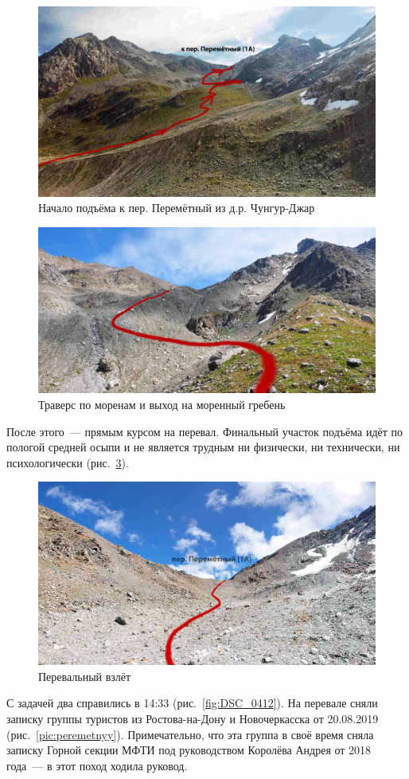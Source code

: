 \begin{figure}[h!]
	\centering
	\includegraphics[width=0.7\linewidth]{../pics/perem_1}
	\caption{Начало подъёма к пер. Перемётный из д.р. Чунгур-Джар}
	\label{fig:perem_1}
\end{figure} 
\begin{figure}[h!]
	\centering
	\includegraphics[width=0.7\linewidth]{../pics/DSC_0280.jpg}
	\caption{Траверс по моренам и выход на  моренный гребень}
	\label{fig:DSC_0280}
\end{figure} 


После этого~--- прямым курсом на перевал. Финальный участок подъёма идёт по пологой средней осыпи и не является трудным ни физически, ни технически, ни психологически (рис.~\ref{fig:DSC_0341}).
\begin{figure}[h!]
	\centering
	\includegraphics[width=0.7\linewidth]{../pics/DSC_0341.jpg}
	\caption{Перевальный взлёт}
	\label{fig:DSC_0341}
\end{figure} 

С задачей два справились в 14:33 (рис.~\ref{fig:DSC_0412}). На перевале сняли записку группы туристов из Ростова-на-Дону и Новочеркасска от 20.08.2019 (рис.~\ref{pic:peremetnyy}). Примечательно, что эта группа в своё время сняла записку Горной секции МФТИ под руководством Королёва Андрея от 2018 года~--- в этот поход ходила руковод.

